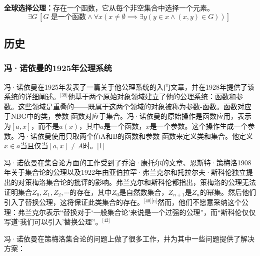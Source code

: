 \textbf{全球选择公理：}存在一个函数，它从每个非空集合中选择一个元素。
\[
\exists G\,[G \text{ 是一个函数} \land \forall x (x \neq \emptyset \implies \exists y (y \in x \land (x,y) \in G))]~
\]
\subsection{历史}
\subsubsection{冯·诺依曼的1925年公理系统}  
冯·诺依曼在1925年发表了一篇关于他公理系统的入门文章，并在1928年提供了该系统的详细阐述。\(^\text{[39]}\)他基于两个原始对象领域建立了他的公理系统：函数和参数。这些领域是重叠的——既属于这两个领域的对象被称为参数-函数。函数对应于NBG中的类，参数-函数对应于集合。冯·诺依曼的原始操作是函数应用，表示为\([a, x]\)，而不是\(a(x)\)，其中\(a\)是一个函数，\(x\)是一个参数。这个操作生成一个参数。冯·诺依曼使用只取两个值A和B的函数和参数-函数来定义类和集合。他定义\(x \in a\)当且仅当\([a, x] \ne A\)时。[1]

冯·诺依曼在集合论方面的工作受到了乔治·康托尔的文章、恩斯特·策梅洛1908年关于集合论的公理以及1922年由亚伯拉罕·弗兰克尔和托拉尔夫·斯科伦独立提出的对策梅洛集合论的批评的影响。弗兰克尔和斯科伦都指出，策梅洛的公理无法证明集合{\(Z_0,Z_1,Z_2,\cdots\)}的存在，其中\(Z_0\)是自然数集合，\(Z_{n+1}\)是\(Z_n\)的幂集。然后他们引入了替换公理，这将保证此类集合的存在。\(^\text{[40][n]}\)然而，他们不愿意采纳这个公理：弗兰克尔表示“替换对于‘一般集合论’来说是一个过强的公理”，而“斯科伦仅仅写道‘我们可以引入’替换公理”。\(^\text{[42]}\)

冯·诺依曼在策梅洛集合论的问题上做了很多工作，并为其中一些问题提供了解决方案：

